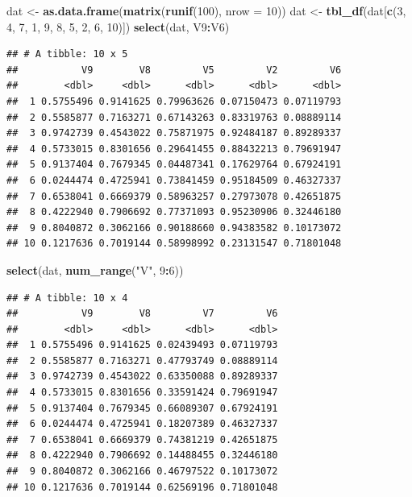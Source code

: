 \documentclass[]{book}
\newenvironment{Shaded}{\begin{snugshade}}{\end{snugshade}}
\newcommand{\KeywordTok}[1]{\textcolor[rgb]{0.13,0.29,0.53}{\textbf{#1}}}
\newcommand{\DataTypeTok}[1]{\textcolor[rgb]{0.13,0.29,0.53}{#1}}
\newcommand{\DecValTok}[1]{\textcolor[rgb]{0.00,0.00,0.81}{#1}}
\newcommand{\StringTok}[1]{\textcolor[rgb]{0.31,0.60,0.02}{#1}}
\newcommand{\OperatorTok}[1]{\textcolor[rgb]{0.81,0.36,0.00}{\textbf{#1}}}
\newcommand{\NormalTok}[1]{#1}
\begin{document}
\begin{Shaded}
\begin{Highlighting}[]
\NormalTok{dat <-}\StringTok{ }\KeywordTok{as.data.frame}\NormalTok{(}\KeywordTok{matrix}\NormalTok{(}\KeywordTok{runif}\NormalTok{(}\DecValTok{100}\NormalTok{), }\DataTypeTok{nrow =} \DecValTok{10}\NormalTok{))}
\NormalTok{dat <-}\StringTok{ }\KeywordTok{tbl_df}\NormalTok{(dat[}\KeywordTok{c}\NormalTok{(}\DecValTok{3}\NormalTok{, }\DecValTok{4}\NormalTok{, }\DecValTok{7}\NormalTok{, }\DecValTok{1}\NormalTok{, }\DecValTok{9}\NormalTok{, }\DecValTok{8}\NormalTok{, }\DecValTok{5}\NormalTok{, }\DecValTok{2}\NormalTok{, }\DecValTok{6}\NormalTok{, }\DecValTok{10}\NormalTok{)])}
\KeywordTok{select}\NormalTok{(dat, V9}\OperatorTok{:}\NormalTok{V6)}
\end{Highlighting}
\end{Shaded}

\begin{verbatim}
## # A tibble: 10 x 5
##           V9        V8         V5         V2         V6
##        <dbl>     <dbl>      <dbl>      <dbl>      <dbl>
##  1 0.5755496 0.9141625 0.79963626 0.07150473 0.07119793
##  2 0.5585877 0.7163271 0.67143263 0.83319763 0.08889114
##  3 0.9742739 0.4543022 0.75871975 0.92484187 0.89289337
##  4 0.5733015 0.8301656 0.29641455 0.88432213 0.79691947
##  5 0.9137404 0.7679345 0.04487341 0.17629764 0.67924191
##  6 0.0244474 0.4725941 0.73841459 0.95184509 0.46327337
##  7 0.6538041 0.6669379 0.58963257 0.27973078 0.42651875
##  8 0.4222940 0.7906692 0.77371093 0.95230906 0.32446180
##  9 0.8040872 0.3062166 0.90188660 0.94383582 0.10173072
## 10 0.1217636 0.7019144 0.58998992 0.23131547 0.71801048
\end{verbatim}

\begin{Shaded}
\begin{Highlighting}[]
\KeywordTok{select}\NormalTok{(dat, }\KeywordTok{num_range}\NormalTok{(}\StringTok{"V"}\NormalTok{, }\DecValTok{9}\OperatorTok{:}\DecValTok{6}\NormalTok{))}
\end{Highlighting}
\end{Shaded}

\begin{verbatim}
## # A tibble: 10 x 4
##           V9        V8         V7         V6
##        <dbl>     <dbl>      <dbl>      <dbl>
##  1 0.5755496 0.9141625 0.02439493 0.07119793
##  2 0.5585877 0.7163271 0.47793749 0.08889114
##  3 0.9742739 0.4543022 0.63350088 0.89289337
##  4 0.5733015 0.8301656 0.33591424 0.79691947
##  5 0.9137404 0.7679345 0.66089307 0.67924191
##  6 0.0244474 0.4725941 0.18207389 0.46327337
##  7 0.6538041 0.6669379 0.74381219 0.42651875
##  8 0.4222940 0.7906692 0.14488455 0.32446180
##  9 0.8040872 0.3062166 0.46797522 0.10173072
## 10 0.1217636 0.7019144 0.62569196 0.71801048
\end{verbatim}
\end{document}
